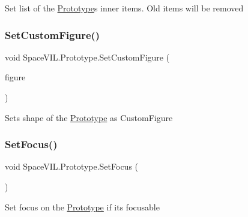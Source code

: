 Set list of the \mbox{\hyperlink{class_space_v_i_l_1_1_prototype}{Prototype}}\textquotesingle{}s inner items. Old items will be removed 

\mbox{\label{class_space_v_i_l_1_1_prototype_a7c6bb62d8c795366532c7295b2b71d30}} 
\subsubsection{\texorpdfstring{Set\+Custom\+Figure()}{SetCustomFigure()}}
{\footnotesize\ttfamily void Space\+V\+I\+L.\+Prototype.\+Set\+Custom\+Figure (\begin{DoxyParamCaption}\item[{\mbox{\hyperlink{class_space_v_i_l_1_1_decorations_1_1_custom_figure}{Custom\+Figure}}}]{figure }\end{DoxyParamCaption})\hspace{0.3cm}{\ttfamily [inline]}}



Sets shape of the \mbox{\hyperlink{class_space_v_i_l_1_1_prototype}{Prototype}} as Custom\+Figure 

\mbox{\label{class_space_v_i_l_1_1_prototype_aa91a8d681b1d1c597aa87d644c9e19a5}} 
\subsubsection{\texorpdfstring{Set\+Focus()}{SetFocus()}}
{\footnotesize\ttfamily void Space\+V\+I\+L.\+Prototype.\+Set\+Focus (\begin{DoxyParamCaption}{ }\end{DoxyParamCaption})\hspace{0.3cm}{\ttfamily [inline]}}



Set focus on the \mbox{\hyperlink{class_space_v_i_l_1_1_prototype}{Prototype}} if its focusable 

\mbox{\label{class_space_v_i_l_1_1_prototype_a3f460b82d96e624ae4f2c203774d6c60}} 
